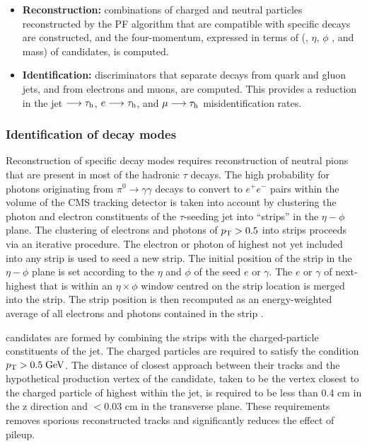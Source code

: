 \begin{itemize}
	\item \textbf{Reconstruction:} combinations of charged and neutral particles reconstructed by the PF algorithm that are compatible with specific \hadtau decays are constructed, and the four-momentum, expressed in terms of (\pt, \ensuremath{\eta}, \ensuremath{\phi} , and mass) of \hadtau candidates, is computed.
	
	\item \textbf{Identification:} discriminators that separate \hadtau decays from quark and gluon jets, and from electrons and muons, are computed. This provides a reduction in the jet \ensuremath{\longrightarrow \hadtau}, \ensuremath{e \longrightarrow \hadtau}, and \ensuremath{\mu \longrightarrow \hadtau} misidentification rates.
\end{itemize}

\subsubsection{Identification of decay modes}

Reconstruction of specific \hadtau decay modes requires reconstruction of neutral pions that are present in most of the hadronic \ensuremath{\tau} decays. The high probability for photons originating from \ensuremath{\pi^{0} \longrightarrow \gamma \gamma} decays to convert to \ensuremath{e^{+}e^{-}} pairs within the volume of the CMS tracking detector is taken into account by clustering the photon and electron constituents of the \ensuremath{\tau}-seeding jet into “strips” in the \ensuremath{\eta - \phi} plane. The clustering of electrons and photons of \ensuremath{\pt > 0.5} \gev into strips proceeds via an iterative procedure. The electron or photon of highest \pt not yet included into any strip is used to seed a new strip. The initial position of the strip in the \ensuremath{\eta - \phi} plane is set according to the \ensuremath{\eta} and \ensuremath{\phi} of the seed \ensuremath{e} or \ensuremath{\gamma}. The \ensuremath{e} or \ensuremath{\gamma} of next-highest \pt that is within an \ensuremath{\eta \times \phi} window centred on the strip location is merged into the strip. The strip position is then recomputed as an energy-weighted average of all electrons and photons contained in the strip \cite{Khachatryan:2015dfa}.

\hadtau candidates are formed by combining the strips with the charged-particle constituents of the jet. The charged particles are required to satisfy the condition \ensuremath{\pt > 0.5 \gev}. The distance of closest approach between their tracks and the hypothetical production vertex of the \hadtau candidate, taken to be the vertex closest to the charged particle of highest \pt within the jet, is required to be less than 0.4 cm in the z direction and \ensuremath{< 0.03} cm in the transverse plane. These requirements removes sporious reconstructed tracks and significantly reduces the effect of pileup.

